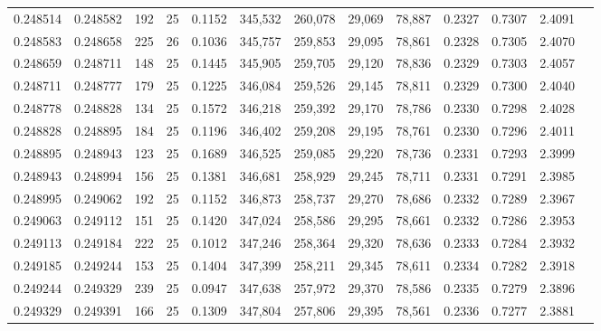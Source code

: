\begin{tabular}{rrrrrrrrrrrrr}
0.248514 & 0.248582 &   192 &  25 &                                     0.1152 & 345,532 & 260,078 &  29,069 &  78,887 & 0.2327 & 0.7307 & 2.4091 \\
0.248583 & 0.248658 &   225 &  26 &                                     0.1036 & 345,757 & 259,853 &  29,095 &  78,861 & 0.2328 & 0.7305 & 2.4070 \\
0.248659 & 0.248711 &   148 &  25 &                                     0.1445 & 345,905 & 259,705 &  29,120 &  78,836 & 0.2329 & 0.7303 & 2.4057 \\
0.248711 & 0.248777 &   179 &  25 &                                     0.1225 & 346,084 & 259,526 &  29,145 &  78,811 & 0.2329 & 0.7300 & 2.4040 \\
0.248778 & 0.248828 &   134 &  25 &                                     0.1572 & 346,218 & 259,392 &  29,170 &  78,786 & 0.2330 & 0.7298 & 2.4028 \\
0.248828 & 0.248895 &   184 &  25 &                                     0.1196 & 346,402 & 259,208 &  29,195 &  78,761 & 0.2330 & 0.7296 & 2.4011 \\
0.248895 & 0.248943 &   123 &  25 &                                     0.1689 & 346,525 & 259,085 &  29,220 &  78,736 & 0.2331 & 0.7293 & 2.3999 \\
0.248943 & 0.248994 &   156 &  25 &                                     0.1381 & 346,681 & 258,929 &  29,245 &  78,711 & 0.2331 & 0.7291 & 2.3985 \\
0.248995 & 0.249062 &   192 &  25 &                                     0.1152 & 346,873 & 258,737 &  29,270 &  78,686 & 0.2332 & 0.7289 & 2.3967 \\
0.249063 & 0.249112 &   151 &  25 &                                     0.1420 & 347,024 & 258,586 &  29,295 &  78,661 & 0.2332 & 0.7286 & 2.3953 \\
0.249113 & 0.249184 &   222 &  25 &                                     0.1012 & 347,246 & 258,364 &  29,320 &  78,636 & 0.2333 & 0.7284 & 2.3932 \\
0.249185 & 0.249244 &   153 &  25 &                                     0.1404 & 347,399 & 258,211 &  29,345 &  78,611 & 0.2334 & 0.7282 & 2.3918 \\
0.249244 & 0.249329 &   239 &  25 &                                     0.0947 & 347,638 & 257,972 &  29,370 &  78,586 & 0.2335 & 0.7279 & 2.3896 \\
0.249329 & 0.249391 &   166 &  25 &                                     0.1309 & 347,804 & 257,806 &  29,395 &  78,561 & 0.2336 & 0.7277 & 2.3881 \\

\end{tabular}
